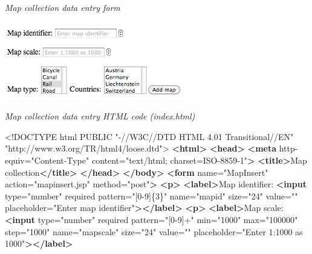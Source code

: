 \documentclass[
]{article}
\newenvironment{Shaded}{\begin{snugshade}}{\end{snugshade}}
\newcommand{\DataTypeTok}[1]{\textcolor[rgb]{0.13,0.29,0.53}{#1}}
\newcommand{\KeywordTok}[1]{\textcolor[rgb]{0.13,0.29,0.53}{\textbf{#1}}}
\newcommand{\NormalTok}[1]{#1}
\newcommand{\OtherTok}[1]{\textcolor[rgb]{0.56,0.35,0.01}{#1}}
\newcommand{\StringTok}[1]{\textcolor[rgb]{0.31,0.60,0.02}{#1}}
\begin{document}
\emph{Map collection data entry form}

\includegraphics{Figures/Chapter 22/data-entry.png}

\emph{Map collection data entry HTML code (index.html)}

\begin{Shaded}
\begin{Highlighting}[]
\DataTypeTok{\textless{}!DOCTYPE }\NormalTok{html PUBLIC "{-}//W3C//DTD HTML 4.01 Transitional//EN" "http://www.w3.org/TR/html4/loose.dtd"}\DataTypeTok{\textgreater{}}
\KeywordTok{\textless{}html\textgreater{}}
\KeywordTok{\textless{}head\textgreater{}}
\KeywordTok{\textless{}meta}\OtherTok{ http{-}equiv=}\StringTok{"Content{-}Type"}\OtherTok{ content=}\StringTok{"text/html; charset=ISO{-}8859{-}1"}\KeywordTok{\textgreater{}}
\KeywordTok{\textless{}title\textgreater{}}\NormalTok{Map collection}\KeywordTok{\textless{}/title\textgreater{}}
\KeywordTok{\textless{}/head\textgreater{}}
\KeywordTok{\textless{}/body\textgreater{}}
\KeywordTok{\textless{}form}\OtherTok{ name=}\StringTok{"MapInsert"}\OtherTok{ action=}\StringTok{"mapinsert.jsp"}\OtherTok{ method=}\StringTok{"post"}\KeywordTok{\textgreater{}}
    \KeywordTok{\textless{}p\textgreater{}}
        \KeywordTok{\textless{}label\textgreater{}}\NormalTok{Map identifier: }\KeywordTok{\textless{}input}\OtherTok{ type=}\StringTok{"number"}\OtherTok{ required}
\OtherTok{            pattern=}\StringTok{"[0{-}9]\{3\}"}\OtherTok{ name=}\StringTok{"mapid"}\OtherTok{ size=}\StringTok{"24"}\OtherTok{ value=}\StringTok{""}
\OtherTok{            placeholder=}\StringTok{"Enter map identifier"}\KeywordTok{\textgreater{}\textless{}/label\textgreater{}}
    \KeywordTok{\textless{}p\textgreater{}}
        \KeywordTok{\textless{}label\textgreater{}}\NormalTok{Map scale: }\KeywordTok{\textless{}input}\OtherTok{ type=}\StringTok{"number"}\OtherTok{ required}
\OtherTok{            pattern=}\StringTok{"[0{-}9]+"}\OtherTok{ min=}\StringTok{"1000"}\OtherTok{ max=}\StringTok{"100000"}\OtherTok{ step=}\StringTok{"1000"}\OtherTok{ name=}\StringTok{"mapscale"}
\OtherTok{            size=}\StringTok{"24"}\OtherTok{ value=}\StringTok{""}\OtherTok{ placeholder=}\StringTok{"Enter 1:1000 as 1000"}\KeywordTok{\textgreater{}\textless{}/label\textgreater{}}

\end{Highlighting}
\end{Shaded}
\end{document}
